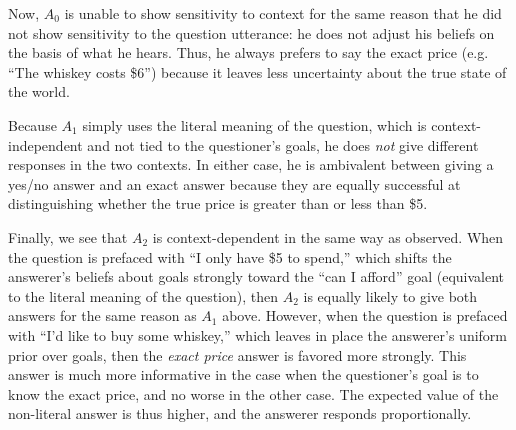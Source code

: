 \documentclass[12pt, floatsintext, jou]{apa6}
\begin{document}
Now, $A_0$ is unable to show sensitivity to context for the same reason that he did not show sensitivity to the question utterance: he does not adjust his beliefs on the basis of what he hears. Thus, he always prefers to say the exact price (e.g. ``The whiskey costs \$6'') because it leaves less uncertainty about the true state of the world.

Because $A_1$ simply uses the literal meaning of the question, which is context-independent and not tied to the questioner's goals, he does \emph{not} give different responses in the two contexts. In either case, he is ambivalent between giving a yes/no answer and an exact answer because they are equally successful at distinguishing whether the true price is greater than or less than \$5. 

Finally, we see that $A_2$ is context-dependent in the same way as  observed. When the question is prefaced with ``I only have \$5 to spend,'' which shifts the answerer's beliefs about goals strongly toward the ``can I afford'' goal (equivalent to the literal meaning of the question), then $A_2$ is equally likely to give both answers for the same reason as $A_1$ above. However, when the question is prefaced with ``I'd like to buy some whiskey,'' which leaves in place the answerer's uniform prior over goals, then the \emph{exact price} answer is favored more strongly. This answer is much more informative in the case when the questioner's goal is to know the exact price, and no worse in the other case. The expected value of the non-literal answer is thus higher, and the answerer responds proportionally. 
\end{document}
